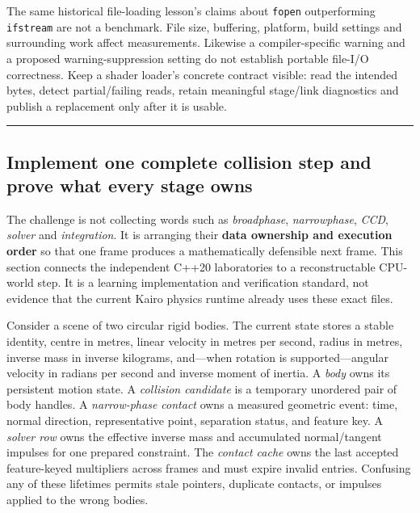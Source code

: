 The same historical file-loading lesson's claims about \texttt{fopen} outperforming \texttt{ifstream} are not a benchmark. File size, buffering, platform, build settings and surrounding work affect measurements. Likewise a compiler-specific warning and a proposed warning-suppression setting do not establish portable file-I/O correctness. Keep a shader loader's concrete contract visible: read the intended bytes, detect partial/failing reads, retain meaningful stage/link diagnostics and publish a replacement only after it is usable.

\begin{center}\rule{0.5\linewidth}{0.5pt}\end{center}

\subsection{Implement one complete collision step and prove what every stage owns}\label{06-engine-ii-ch046-implement-one-complete-collision-step-and-prove-what-every-stage-owns}

\hypertarget{06-engine-ii-ch046-implement-one-complete-collision-step-and-prove-what-every-stage-owns}{}

The challenge is not collecting words such as \emph{broadphase}, \emph{narrowphase}, \emph{CCD}, \emph{solver} and \emph{integration}. It is arranging their \textbf{data ownership and execution order} so that one frame produces a mathematically defensible next frame. This section connects the independent C++20 laboratories to a reconstructable CPU-world step. It is a learning implementation and verification standard, not evidence that the current Kairo physics runtime already uses these exact files.

Consider a scene of two circular rigid bodies. The current state stores a stable identity, centre in metres, linear velocity in metres per second, radius in metres, inverse mass in inverse kilograms, and---when rotation is supported---angular velocity in radians per second and inverse moment of inertia. A \emph{body} owns its persistent motion state. A \emph{collision candidate} is a temporary unordered pair of body handles. A \emph{narrow-phase contact} owns a measured geometric event: time, normal direction, representative point, separation status, and feature key. A \emph{solver row} owns the effective inverse mass and accumulated normal/tangent impulses for one prepared constraint. The \emph{contact cache} owns the last accepted feature-keyed multipliers across frames and must expire invalid entries. Confusing any of these lifetimes permits stale pointers, duplicate contacts, or impulses applied to the wrong bodies.

